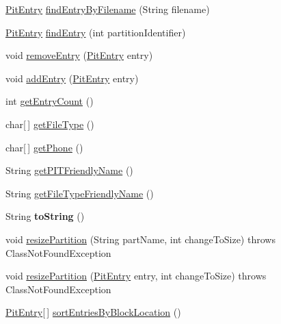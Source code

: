 \begin{DoxyCompactItemize}
\item 
\hyperlink{classCASUAL_1_1archiving_1_1libpit_1_1PitEntry}{Pit\-Entry} \hyperlink{classCASUAL_1_1archiving_1_1libpit_1_1PitData_ac07383ca9cf4750eb9de5cdf1690121f}{find\-Entry\-By\-Filename} (String filename)
\item 
\hyperlink{classCASUAL_1_1archiving_1_1libpit_1_1PitEntry}{Pit\-Entry} \hyperlink{classCASUAL_1_1archiving_1_1libpit_1_1PitData_a5d139fcadf351b81b00298f1578a9cc5}{find\-Entry} (int partition\-Identifier)
\item 
void \hyperlink{classCASUAL_1_1archiving_1_1libpit_1_1PitData_a2102b1e03aa2de4c6d80f8e43576b06d}{remove\-Entry} (\hyperlink{classCASUAL_1_1archiving_1_1libpit_1_1PitEntry}{Pit\-Entry} entry)
\item 
void \hyperlink{classCASUAL_1_1archiving_1_1libpit_1_1PitData_aea22df6b38acde79df88ea8255e60ec2}{add\-Entry} (\hyperlink{classCASUAL_1_1archiving_1_1libpit_1_1PitEntry}{Pit\-Entry} entry)
\item 
int \hyperlink{classCASUAL_1_1archiving_1_1libpit_1_1PitData_a64a120bc22b1061952e01188a30f7eeb}{get\-Entry\-Count} ()
\item 
char\mbox{[}$\,$\mbox{]} \hyperlink{classCASUAL_1_1archiving_1_1libpit_1_1PitData_a07f12e00c2077eebc28fc251f87752f8}{get\-File\-Type} ()
\item 
char\mbox{[}$\,$\mbox{]} \hyperlink{classCASUAL_1_1archiving_1_1libpit_1_1PitData_a1cdc24d3cdfdd1e716a856fb3cb2c22d}{get\-Phone} ()
\item 
String \hyperlink{classCASUAL_1_1archiving_1_1libpit_1_1PitData_ab1c581d014e995eab5c36c72ef8c4417}{get\-P\-I\-T\-Friendly\-Name} ()
\item 
String \hyperlink{classCASUAL_1_1archiving_1_1libpit_1_1PitData_a16d06e906b55316b5559420e93ead64d}{get\-File\-Type\-Friendly\-Name} ()
\item 
\hypertarget{classCASUAL_1_1archiving_1_1libpit_1_1PitData_a9f65e9c2ef9988d9dae1fbd30fd0b9fc}{String {\bfseries to\-String} ()}\label{classCASUAL_1_1archiving_1_1libpit_1_1PitData_a9f65e9c2ef9988d9dae1fbd30fd0b9fc}

\item 
void \hyperlink{classCASUAL_1_1archiving_1_1libpit_1_1PitData_ad9bf38702c94c0e25ea1e2175a14e8c8}{resize\-Partition} (String part\-Name, int change\-To\-Size)  throws Class\-Not\-Found\-Exception
\item 
void \hyperlink{classCASUAL_1_1archiving_1_1libpit_1_1PitData_ac5958719c4de4485093dd5d7a6ca1c65}{resize\-Partition} (\hyperlink{classCASUAL_1_1archiving_1_1libpit_1_1PitEntry}{Pit\-Entry} entry, int change\-To\-Size)  throws Class\-Not\-Found\-Exception 
\item 
\hyperlink{classCASUAL_1_1archiving_1_1libpit_1_1PitEntry}{Pit\-Entry}\mbox{[}$\,$\mbox{]} \hyperlink{classCASUAL_1_1archiving_1_1libpit_1_1PitData_aad4e04c99c61973ec42a1737dd6f156a}{sort\-Entries\-By\-Block\-Location} ()
\end{DoxyCompactItemize}
